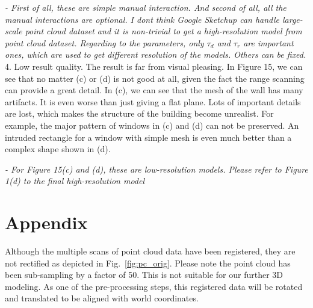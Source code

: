 \documentclass[12pt,letterpaper]{article}
\newcommand{\Fig}[1]{Fig.~\ref{fig:#1}}
\begin{document}
{\it - First of all, these are simple manual interaction. And second of all, all the manual interactions are optional. 
I dont think Google Sketchup can handle large-scale point cloud dataset and it is non-trivial to get
a high-resolution model from point cloud dataset.
Regarding to the parameters, only $\tau_d$ and $\tau_r$ are important ones, which are used to
get different resolution of the models. Others can be fixed.}\\

4. Low result quality.
The result is far from visual pleasing. In Figure 15, we can see that no matter (c) or
(d) is not good at all, given the fact the range scanning can provide a great detail.
In (c), we can see that the mesh of the wall has many artifacts. It is even worse than
just giving a flat plane. Lots of important details are lost, which makes the
structure of the building become unrealist. For example, the major pattern of windows
in (c) and (d) can not be preserved. An intruded rectangle for a window with simple
mesh is even much better than a complex shape shown in (d).

{\it - For Figure 15(c) and (d), these are low-resolution models. Please refer to 
Figure 1(d) to the final high-resolution model} \\

\section{Appendix}
Although the multiple scans of point cloud data have been registered, 
they are not rectified as depicted in \Fig{pc_orig}. 
Please note the point cloud has been sub-sampling by a factor of 50.
This is not suitable for our further 3D modeling.
As one of the pre-processing steps, this registered data will be rotated
and translated to be aligned with world coordinates.
\end{document}
